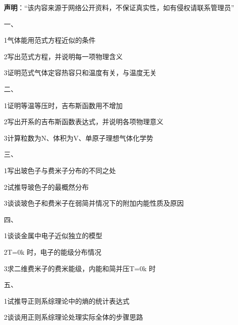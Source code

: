 
\textbf{声明}：“该内容来源于网络公开资料，不保证真实性，如有侵权请联系管理员”



一、

{1}气体能用范式方程近似的条件

{2}写出范式方程，并说明每一项物理含义

{3}证明范式气体定容热容只和温度有关，与温度无关


二、

{1}证明等温等压时，吉布斯函数用不增加

{2}写出开系的吉布斯函数表达式，并说明各项物理意义

{3}计算粒数为N、体积为V、单原子理想气体化学势

三、

{1}写出玻色子与费米子分布的不同之处

{2}试推导玻色子的最概然分布

{3}谈谈玻色子和费米子在弱简并情况下的附加内能性质及原因

四、

{1}谈谈金属中电子近似独立的模型

{2}T=0k 时，电子的能级分布情况

{3}求二维费米子的费米能级，内能和简并压{T=0k 时}

五、

{1}试推导正则系综理论中的熵的统计表达式

{2}谈谈用正则系综理论处理实际全体的步骤思路